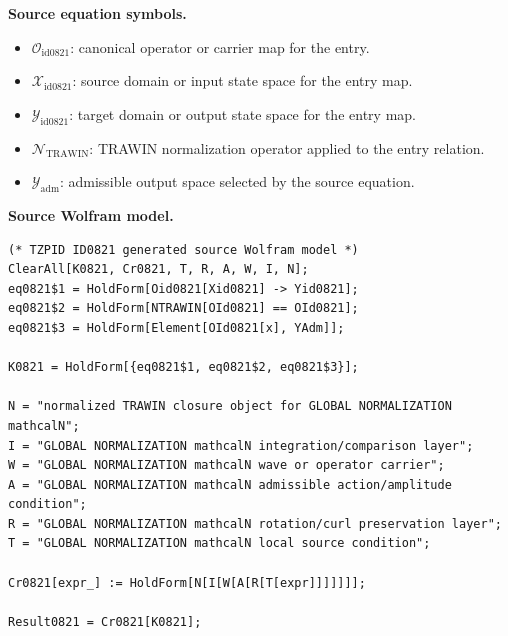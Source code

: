 \begin{minipage}[t]{0.49\linewidth}
\begingroup
\small
\raggedright
\textbf{Source equation symbols.}\par
\begin{itemize}[leftmargin=1.35em,itemsep=1pt,topsep=1pt,parsep=0pt]
    \item $\mathcal{O}_{\mathrm{id0821}}$: canonical operator or carrier map for the entry.
    \item $\mathcal{X}_{\mathrm{id0821}}$: source domain or input state space for the entry map.
    \item $\mathcal{Y}_{\mathrm{id0821}}$: target domain or output state space for the entry map.
    \item $\mathcal{N}_{\mathrm{TRAWIN}}$: TRAWIN normalization operator applied to the entry relation.
    \item $\mathcal{Y}_{\mathrm{adm}}$: admissible output space selected by the source equation.
\end{itemize}
\endgroup
\end{minipage}\hfill
\begin{minipage}[t]{0.47\linewidth}
\begingroup
\scriptsize
\raggedright
\textbf{Source Wolfram model.}\par
\begin{Verbatim}[fontsize=\tiny,breaklines=true,breakanywhere=true]
(* TZPID ID0821 generated source Wolfram model *)
ClearAll[K0821, Cr0821, T, R, A, W, I, N];
eq0821$1 = HoldForm[Oid0821[Xid0821] -> Yid0821];
eq0821$2 = HoldForm[NTRAWIN[OId0821] == OId0821];
eq0821$3 = HoldForm[Element[OId0821[x], YAdm]];

K0821 = HoldForm[{eq0821$1, eq0821$2, eq0821$3}];

N = "normalized TRAWIN closure object for GLOBAL NORMALIZATION mathcalN";
I = "GLOBAL NORMALIZATION mathcalN integration/comparison layer";
W = "GLOBAL NORMALIZATION mathcalN wave or operator carrier";
A = "GLOBAL NORMALIZATION mathcalN admissible action/amplitude condition";
R = "GLOBAL NORMALIZATION mathcalN rotation/curl preservation layer";
T = "GLOBAL NORMALIZATION mathcalN local source condition";

Cr0821[expr_] := HoldForm[N[I[W[A[R[T[expr]]]]]]];

Result0821 = Cr0821[K0821];
\end{Verbatim}
\endgroup
\end{minipage}

